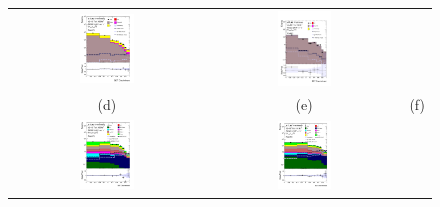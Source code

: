 \documentclass[PAPER, coverpage, atlasdraft=true, texlive=2016, UKenglish]{\ATLASLATEXPATH atlasdoc}
\begin{document}
\begin{figure}[H]
\begin{tabular}{@{}ccc@{}}
\includegraphics[width=0.29\textwidth]{figures/tuH_reg1l1tau1b3j_os.pdf}&
\includegraphics[width=0.29\textwidth]{figures/tuH_reg1l2tau1bnj_ss.pdf}\\
(d) & (e)  & (f) \\
\includegraphics[width=0.29\textwidth]{figures/tuH_reg2mtau1b2jos.pdf}&
\includegraphics[width=0.29\textwidth]{figures/tuH_reg2mtau1b3jos.pdf}&

\end{tabular}
\end{figure}
\end{document}
